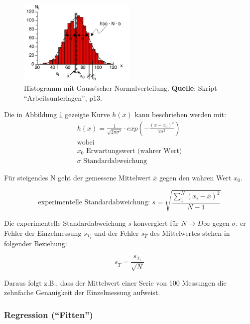 \begin{figure}[h!]
    \centering
    \includegraphics[width=0.5\textwidth]{images/gauss.png}
    \caption{Histogramm mit Gauss'scher Normalverteilung. \textbf{Quelle}: Skript ``Arbeitsunterlagen'', p13.}
    \label{fig:gauss}
\end{figure}

Die in Abbildung \ref{fig:gauss} gezeigte Kurve $h(x)$ kann beschrieben werden mit:
\begin{gather}
    h(x) = \frac{1}{\sqrt{2\pi\sigma^2}} \cdot exp\left(- \frac{(x-x_0)^2}{2\sigma^2}\right) \\
    \text{wobei} \\
    x_0 \text{ Erwartungswert (wahrer Wert)} \\
    \sigma \text{ Standardabweichung}
\end{gather}

F\"ur steigendes N geht der gemessene Mittelwert $\overline{x}$ gegen den wahren Wert $x_0$.

\begin{equation}
    \text{experimentelle Standardabweichung: } s = \sqrt{\frac{\sum_1^N{(x_i-\overline{x})^2}}{N-1}}
\end{equation}

Die  experimentelle Standardabweichung  $s$ konvergiert  f\"ur $N  \rightarrow
D\infty $ gegen $\sigma$. er Fehler der Einzelmessung $s_{T_i}$ und der Fehler
$s_{\overline{T}}$ des Mittelwertes stehen in folgender Beziehung:

\begin{equation}
    s_{\overline{T}} = \frac{s_{T_i}}{\sqrt{N}}
\end{equation}

Daraus  folgt z.B.,  dass der  Mittelwert einer  Serie von  100 Messungen  die
zehnfache Genauigkeit der Einzelmessung aufweist.


\subsubsection{Regression (``Fitten'')}

